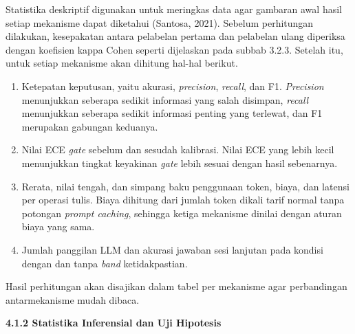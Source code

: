 \documentclass[12pt,a4paper]{article}
\newcommand{\asing}[1]{\textit{#1}}
\newcommand{\subsubbab}[2]{%
  \par\vspace{0.5em}\phantomsection\label{#2}%
  \noindent\textbf{#1}\par\nopagebreak\vspace{0.2em}}
\begin{document}
Statistika deskriptif digunakan untuk meringkas data agar gambaran awal hasil setiap mekanisme dapat diketahui (Santosa, 2021). Sebelum perhitungan dilakukan, kesepakatan antara pelabelan pertama dan pelabelan ulang diperiksa dengan koefisien kappa Cohen seperti dijelaskan pada subbab 3.2.3. Setelah itu, untuk setiap mekanisme akan dihitung hal-hal berikut.
\begin{enumerate}[leftmargin=1.25cm]
\item Ketepatan keputusan, yaitu akurasi, \asing{precision}, \asing{recall}, dan F1. \asing{Precision} menunjukkan seberapa sedikit informasi yang salah disimpan, \asing{recall} menunjukkan seberapa sedikit informasi penting yang terlewat, dan F1 merupakan gabungan keduanya.
\item Nilai ECE \asing{gate} sebelum dan sesudah kalibrasi. Nilai ECE yang lebih kecil menunjukkan tingkat keyakinan \asing{gate} lebih sesuai dengan hasil sebenarnya.
\item Rerata, nilai tengah, dan simpang baku penggunaan token, biaya, dan latensi per operasi tulis. Biaya dihitung dari jumlah token dikali tarif normal tanpa potongan \asing{prompt caching}, sehingga ketiga mekanisme dinilai dengan aturan biaya yang sama.
\item Jumlah panggilan LLM dan akurasi jawaban sesi lanjutan pada kondisi dengan dan tanpa \asing{band} ketidakpastian.
\end{enumerate}
Hasil perhitungan akan disajikan dalam tabel per mekanisme agar perbandingan antarmekanisme mudah dibaca.

\subsubbab{4.1.2 Statistika Inferensial dan Uji Hipotesis}{sec:4.1.2}
\end{document}
